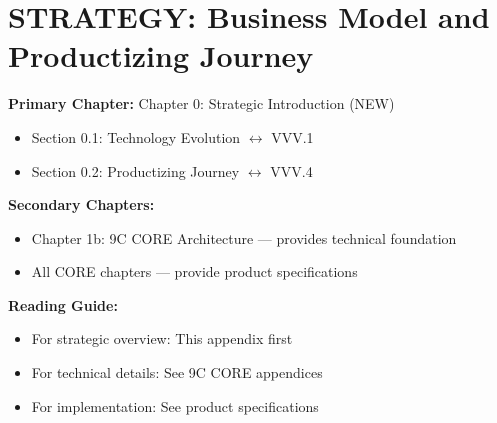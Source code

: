 %
%

%
%
%
%
%

\chapter{STRATEGY: Business Model and Productizing Journey}
\label{app:vvv}

\begin{tcolorbox}[colback=purple!5!white, colframe=purple!75!black,
    title=Chapter Linkage]

\textbf{Primary Chapter:} Chapter 0: Strategic Introduction (NEW)
\begin{itemize}[nosep]
\item Section 0.1: Technology Evolution $\leftrightarrow$ VVV.1
\item Section 0.2: Productizing Journey $\leftrightarrow$ VVV.4
\end{itemize}

\textbf{Secondary Chapters:}
\begin{itemize}[nosep]
\item Chapter 1b: 9C CORE Architecture --- provides technical foundation
\item All CORE chapters --- provide product specifications
\end{itemize}

\textbf{Reading Guide:}
\begin{itemize}[nosep]
\item For strategic overview: This appendix first
\item For technical details: See 9C CORE appendices
\item For implementation: See product specifications
\end{itemize}

\end{tcolorbox}


